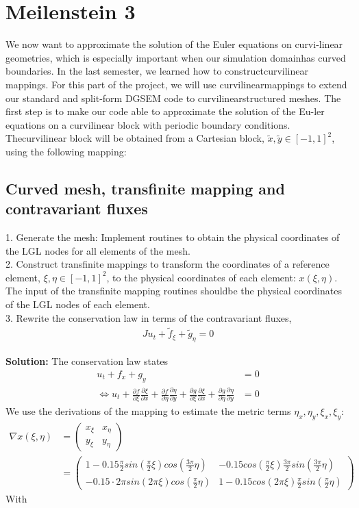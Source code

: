 \documentclass[11pt]{scrartcl}
\begin{document}
\newpage
\section{Meilenstein 3}
We now want to approximate the solution of the Euler equations on curvi-linear geometries, which is especially important when our simulation domainhas curved boundaries. In the last semester, we learned how to constructcurvilinear mappings. For this part of the project, we will use curvilinearmappings to extend our standard and split-form DGSEM code to curvilinearstructured meshes. The first step is to make our code able to approximate the solution of the Eu-ler equations on a curvilinear block with periodic boundary conditions. Thecurvilinear block will be obtained from a Cartesian block, $ \tilde{x}, \tilde{y} \in [-1, 1]^2$, using the following mapping:


\subsection{Curved mesh, transfinite mapping and contravariant fluxes}
1. Generate the mesh: Implement routines to obtain the physical coordinates of the LGL nodes for all elements of the mesh.\\
2. Construct transfinite mappings to transform the coordinates of a reference element, $ \xi, \eta \in [-1, 1]^2$, to the physical coordinates of each element: $x(\xi,\eta)$. The input of the transfinite mapping routines shouldbe the physical coordinates of the LGL nodes of each element.\\
3. Rewrite the conservation law in terms of the contravariant fluxes,
\begin{align*}
  J u_t + \tilde{f}_\xi +\tilde{g}_\eta =0
\end{align*}

\textbf{Solution:}
The conservation law states 
\begin{align*}
 u_t + f_x +g_y &= 0 \\
 \Leftrightarrow  u_t + \frac{\partial f}{\partial\xi} \frac{\partial\xi}{\partial x}+\frac{\partial f}{\partial \eta} \frac{\partial \eta}{\partial y} + \frac{\partial g}{\partial\xi} \frac{\partial\xi}{\partial x}+\frac{\partial g}{\partial\eta} \frac{\partial\eta}{\partial y} &= 0 
\end{align*}
We use the derivations of the mapping to estimate the metric terms $\eta_x, \eta_y, \xi_x, \xi_y$:
\begin{align*}
\nabla x(\xi, \eta) &= 
\begin{pmatrix}
x_\xi & x_\eta\\
y_\xi & y_\eta
\end{pmatrix} \\ &=
\begin{pmatrix}
1 - 0.15 \frac{\pi}{2} sin(\frac{\pi}{2}\xi) cos(\frac{3\pi}{2} \eta) &
- 0.15 cos(\frac{\pi}{2}\xi) \frac{3\pi}{2} sin(\frac{3\pi}{2} \eta) \\
- 0.15 \cdot 2\pi sin(2\pi\xi) cos(\frac{\pi}{2} \eta) &
1 - 0.15 cos(2\pi \xi) \frac{\pi}{2}  sin(\frac{\pi}{2} \eta)
\end{pmatrix}
\end{align*}
With 
\end{document}
